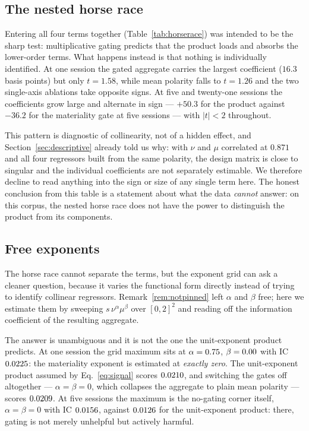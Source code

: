 \subsection{The nested horse race}\label{sec:horserace}

Entering all four terms together (Table~\ref{tab:horserace}) was intended to be
the sharp test: multiplicative gating predicts that the product loads and absorbs
the lower-order terms. What happens instead is that nothing is individually
identified. At one session the gated aggregate carries the largest coefficient
($16.3$ basis points) but only $t=1.58$, while mean polarity falls to $t=1.26$ and
the two single-axis ablations take opposite signs. At five and twenty-one sessions
the coefficients grow large and alternate in sign --- $+50.3$ for the product
against $-36.2$ for the materiality gate at five sessions --- with $|t|<2$
throughout.

This pattern is diagnostic of collinearity, not of a hidden effect, and
Section~\ref{sec:descriptive} already told us why: with $\nu$ and $\mu$ correlated
at $0.871$ and all four regressors built from the same polarity, the design matrix
is close to singular and the individual coefficients are not separately estimable.
We therefore decline to read anything into the sign or size of any single term
here. The honest conclusion from this table is a statement about what the data
\emph{cannot} answer: on this corpus, the nested horse race does not have the
power to distinguish the product from its components.



\subsection{Free exponents}\label{sec:exponents}

The horse race cannot separate the terms, but the exponent grid can ask a cleaner
question, because it varies the functional form directly instead of trying to
identify collinear regressors. Remark~\ref{rem:notpinned} left
$\alpha$ and $\beta$ free; here we estimate them by sweeping
$s\,\nu^{\alpha}\mu^{\beta}$ over $[0,2]^2$ and reading off the information
coefficient of the resulting aggregate.

The answer is unambiguous and it is not the one the unit-exponent product
predicts. At one session the grid maximum sits at
$\alpha=0.75$, $\beta=0.00$ with IC $0.0225$: the
materiality exponent is estimated at \emph{exactly zero}. The unit-exponent
product assumed by Eq.~\eqref{eq:signal} scores $0.0210$, and switching the
gates off altogether --- $\alpha=\beta=0$, which collapses the aggregate to plain
mean polarity --- scores $0.0209$. At five sessions the maximum is the
no-gating corner itself, $\alpha=\beta=0$ with IC $0.0156$, against
$0.0126$ for the unit-exponent product: there, gating is not merely
unhelpful but actively harmful.

